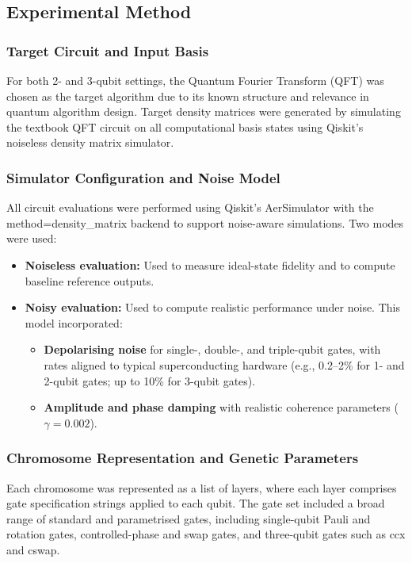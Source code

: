 \documentclass[11pt,a4paper]{article}
\begin{document}
\subsection{Experimental Method}
\subsubsection*{Target Circuit and Input Basis}
For both 2- and 3-qubit settings, the Quantum Fourier Transform (QFT) was chosen as the target algorithm due to its known structure and relevance in quantum algorithm design. Target density matrices were generated by simulating the textbook QFT circuit on all computational basis states using Qiskit's noiseless density matrix simulator.

\subsubsection*{Simulator Configuration and Noise Model}
All circuit evaluations were performed using Qiskit's AerSimulator with the method=density\_matrix backend to support noise-aware simulations. Two modes were used:

\begin{itemize}
    \item \textbf{Noiseless evaluation:} Used to measure ideal-state fidelity and to compute baseline reference outputs.
    \item \textbf{Noisy evaluation:} Used to compute realistic performance under noise. This model incorporated:
    \begin{itemize}
        \item \textbf{Depolarising noise} for single-, double-, and triple-qubit gates, with rates aligned to typical superconducting hardware (e.g., 0.2--2\% for 1- and 2-qubit gates; up to 10\% for 3-qubit gates).
        \item \textbf{Amplitude and phase damping} with realistic coherence parameters ($\gamma = 0.002$).
    \end{itemize}
\end{itemize}

\subsubsection*{Chromosome Representation and Genetic Parameters}
Each chromosome was represented as a list of layers, where each layer comprises gate specification strings applied to each qubit. The gate set included a broad range of standard and parametrised gates, including single-qubit Pauli and rotation gates, controlled-phase and swap gates, and three-qubit gates such as ccx and cswap.\newline
\end{document}
